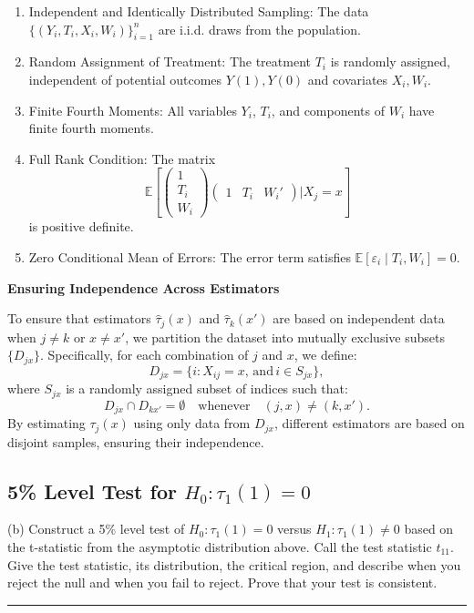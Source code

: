 \documentclass{article}
\newenvironment{colorparagraph}[1]{\par\color{#1}}{\par}
\begin{document}
\begin{enumerate}
    \item Independent and Identically Distributed Sampling: The data \( \{ (Y_i, T_i, X_i, W_i) \}_{i=1}^n \) are i.i.d. draws from the population.
    \item Random Assignment of Treatment: The treatment \( T_i \) is randomly assigned, independent of potential outcomes \( Y(1), Y(0) \) and covariates \( X_i, W_i \).
    \item Finite Fourth Moments: All variables \( Y_i \), \( T_i \), and components of \( W_i \) have finite fourth moments.
    \item Full Rank Condition: The matrix
    \[
    \mathbb{E}\left[ 
    \begin{pmatrix}
    1 \\
    T_i \\
    W_i
    \end{pmatrix}
    \begin{pmatrix}
    1 & T_i & W_i'
    \end{pmatrix}
    \Bigg| X_j = x
    \right]
    \]
    is positive definite.
    \item Zero Conditional Mean of Errors: The error term satisfies \( \mathbb{E}[ \varepsilon_i \mid T_i, W_i ] = 0 \).
\end{enumerate}

\textbf{Ensuring Independence Across Estimators}

To ensure that estimators \( \hat{\tau}_j(x) \) and \( \hat{\tau}_k(x') \) are based on independent data when \( j \neq k \) or \( x \neq x' \), we partition the dataset into mutually exclusive subsets \( \{ D_{jx} \} \). Specifically, for each combination of \( j \) and \( x \), we define:
\[
D_{jx} = \{ i : X_{ij} = x, \, \text{and} \, i \in S_{jx} \},
\]
where \( S_{jx} \) is a randomly assigned subset of indices such that:
\[
D_{jx} \cap D_{k x'} = \emptyset \quad \text{whenever} \quad (j, x) \neq (k, x').
\]
By estimating \( \tau_j(x) \) using only data from \( D_{jx} \), different estimators are based on disjoint samples, ensuring their independence.

\begin{colorparagraph}{questioncolor}
\label{q1b}\subsection{5\% Level Test for \( H_0: \tau_1(1) = 0 \)}
(b) Construct a 5\% level test of \( H_0 : \tau_1(1) = 0 \) versus \( H_1 : \tau_1(1) \neq 0 \) based on the t-statistic from the asymptotic distribution above. Call the test statistic \( t_{11} \). Give the test statistic, its distribution, the critical region, and describe when you reject the null and when you fail to reject. Prove that your test is consistent.

\rule{\textwidth}{0.5pt}
\end{colorparagraph}
\end{document}

